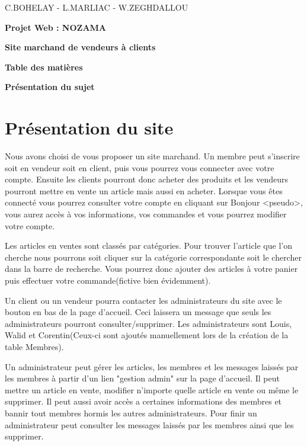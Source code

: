 \documentclass[11pt,a4paper]{article}
\begin{document}
	\begin{center}
		\centering C.BOHELAY - L.MARLIAC - W.ZEGHDALLOU	
	\end{center}
	\bigskip
	\bigskip
	\bigskip
	\bigskip
	\bigskip
	\begin{center}
		\textbf{\Large Projet Web : NOZAMA}
	\end{center}
	\bigskip
	\bigskip
	\bigskip
	\bigskip
	\bigskip
	\begin{center}
		\textbf{\Large Site marchand de vendeurs \`a clients}
		
	\end{center}
	\newpage
	\begin{center}
		\textbf{\Large Table des mati\`eres}
	\end{center}
	\tableofcontents
	\newpage
	\begin{center}
		\textbf{\Large Pr\'esentation du sujet}
	\end{center}
	\bigskip
	\section{Pr\'esentation du site}
	
	Nous avons choisi de vous proposer un site marchand. Un membre peut s'inscrire soit en vendeur soit en client, puis vous pourrez vous connecter avec votre compte. Ensuite les clients pourront donc acheter des produits et les vendeurs pourront mettre en vente un article mais aussi en acheter. Lorsque vous \^etes connect\'e vous pourrez consulter votre compte en cliquant sur Bonjour <pseudo>, vous aurez acc\`es \`a vos informations, vos commandes et vous pourrez modifier votre compte. 
	
	Les articles en ventes sont class\'es par cat\'egories. Pour trouver l'article que l'on cherche nous pourrons soit cliquer sur la cat\'egorie correspondante soit le chercher dans la barre de recherche. Vous pourrez donc ajouter des articles \`a votre panier puis effectuer votre commande(fictive bien \'evidemment). 
	
	Un client ou un vendeur pourra contacter les administrateurs du site avec le bouton en bas de la page d'accueil. Ceci laissera un message que seuls les administrateurs pourront consulter/supprimer. Les administrateurs sont Louis, Walid et Corentin(Ceux-ci sont ajout\'es manuellement lors de la cr\'eation de la table Membres).
	
	Un administrateur peut g\'erer les articles, les membres et les messages laiss\'es par les membres \`a partir d'un lien "gestion admin" sur la page d'accueil. Il peut mettre un article en vente, modifier n'importe quelle article en vente ou m\^eme le supprimer. Il peut aussi avoir acc\`es a certaines informations des membres et bannir tout membres hormis les autres administrateurs. Pour finir un administrateur peut consulter les messages laiss\'es par les membres ainsi que les supprimer.
	
\end{document}
